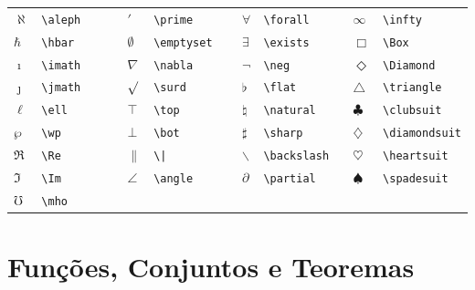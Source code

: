 \documentclass[fleqn]{profmat-cefet}
\begin{document}
\begin{spacing}{1}
\begin{longtable}{p{4mm}p{26mm}p{4mm}p{26mm}p{4mm}p{26mm}p{4mm}p{26mm}} \hline
  $\aleph      $ & \lstinline!\aleph      ! &
  $\prime      $ & \lstinline!\prime      ! &
  $\forall     $ & \lstinline!\forall     ! &
  $\infty      $ & \lstinline!\infty      ! \\
  $\hbar       $ & \lstinline!\hbar       ! &
  $\emptyset   $ & \lstinline!\emptyset   ! &
  $\exists     $ & \lstinline!\exists     ! &
  $\Box        $ & \lstinline!\Box        ! \\
  $\imath      $ & \lstinline!\imath      ! &
  $\nabla      $ & \lstinline!\nabla      ! &
  $\neg        $ & \lstinline!\neg        ! &
  $\Diamond    $ & \lstinline!\Diamond    ! \\
  $\jmath      $ & \lstinline!\jmath      ! &
  $\surd       $ & \lstinline!\surd       ! &
  $\flat       $ & \lstinline!\flat       ! &
  $\triangle   $ & \lstinline!\triangle   ! \\
  $\ell        $ & \lstinline!\ell        ! &
  $\top        $ & \lstinline!\top        ! &
  $\natural    $ & \lstinline!\natural    ! &
  $\clubsuit   $ & \lstinline!\clubsuit   ! \\
  $\wp         $ & \lstinline!\wp         ! &
  $\bot        $ & \lstinline!\bot        ! &
  $\sharp      $ & \lstinline!\sharp      ! &
  $\diamondsuit$ & \lstinline!\diamondsuit! \\
  $\Re         $ & \lstinline!\Re         ! &
  $\|          $ & \lstinline!\|          ! &
  $\backslash  $ & \lstinline!\backslash  ! &
  $\heartsuit  $ & \lstinline!\heartsuit  ! \\
  $\Im         $ & \lstinline!\Im         ! &
  $\angle      $ & \lstinline!\angle      ! &
  $\partial    $ & \lstinline!\partial    ! &
  $\spadesuit  $ & \lstinline!\spadesuit  ! \\
  $\mho        $ & \lstinline!\mho        ! \\ \hline
\end{longtable}

\section{Funções, Conjuntos e Teoremas}



\end{spacing}
\end{document}
